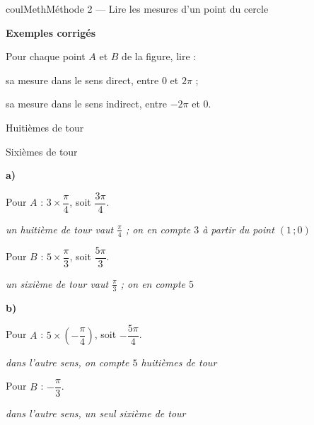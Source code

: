 \documentclass[11pt,a4paper]{article}
\makeatletter
\newcounter{lycee@signet}
\newcommand{\signet}[3][]{\stepcounter{lycee@signet}%
  \edef\lycee@dest{\if\relax\detokenize{#1}\relax
    signet.\arabic{lycee@signet}\else#1\fi}%
  \hypertarget{\lycee@dest}{}\bookmark[level=#2,dest=\lycee@dest]{#3}}
\newcommand{\res}[1]{#1}
\newcounter{methode}
\newenvironment{methodebox}[1][Méthode]{\stepcounter{methode}%
  \begin{boitecours}[phantom={\signet[methode-\arabic{methode}]{2}{#1}}]{coulMeth}{#1}}%
  {\end{boitecours}}
\newcommand{\etape}[1]{\par\smallskip\textbf{\color{coulMeth}#1}\par\nobreak\smallskip}
\newcommand{\explique}[2]{\par\smallskip\noindent
  \begin{minipage}[t]{0.57\linewidth}\raggedright #1\end{minipage}\hfill
  \begin{minipage}[t]{0.40\linewidth}\raggedright\leavevmode
    {\small\itshape\color{black!60}#2}\end{minipage}\par}
\newcommand{\cas}[1]{\par\smallskip\noindent\textbf{\color{coulExo}#1}\vadjust{\nobreak}}
\newenvironment{correction}{\par}{\par}
\newcommand{\etapeexemples}{\etape{Exemples corrigés}}
\makeatother
\begin{document}
\begin{methodebox}[Méthode 2 --- Lire les mesures d'un point du cercle]
\etapeexemples
\begin{minipage}[c]{0.40\linewidth}\raggedright
Pour chaque point $A$ et $B$ de la figure, lire :
\begin{questions}[label=\alph*)]
  \item sa mesure dans le sens direct, entre $0$ et $2\pi$ ;
  \item sa mesure dans le sens indirect, entre $-2\pi$ et $0$.
\end{questions}
\end{minipage}\hfill
\begin{minipage}[c]{0.28\linewidth}\centering
Huitièmes de tour\par
{}
\end{minipage}\hfill
\begin{minipage}[c]{0.28\linewidth}\centering
Sixièmes de tour\par
{}
\end{minipage}
\begin{correction}
\cas{a)}
\explique{Pour $A$ : $3\times\dfrac{\pi}{4}$, soit $\res{\dfrac{3\pi}{4}}$.}{un huitième de tour vaut $\tfrac{\pi}{4}$ ; on en compte $3$ à partir du point $(1\,;0)$}
\explique{Pour $B$ : $5\times\dfrac{\pi}{3}$, soit $\res{\dfrac{5\pi}{3}}$.}{un sixième de tour vaut $\tfrac{\pi}{3}$ ; on en compte $5$}
\cas{b)}
\explique{Pour $A$ : $5\times\left(-\dfrac{\pi}{4}\right)$, soit $\res{-\dfrac{5\pi}{4}}$.}{dans l'autre sens, on compte $5$ huitièmes de tour}
\explique{Pour $B$ : $\res{-\dfrac{\pi}{3}}$.}{dans l'autre sens, un seul sixième de tour}
\end{correction}


\end{methodebox}
\end{document}
